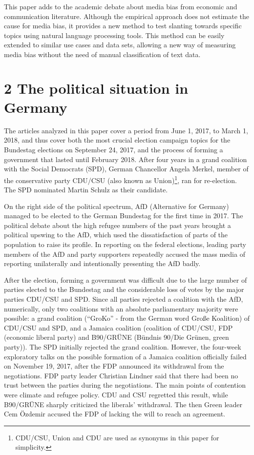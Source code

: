 \documentclass[
  12pt,
]{article}
\begin{document}
This paper adds to the academic debate about media bias from economic
and communication literature. Although the empirical approach does not
estimate the cause for media bias, it provides a new method to test
slanting towards specific topics using natural language processing
tools. This method can be easily extended to similar use cases and data
sets, allowing a new way of measuring media bias without the need of
manual classification of text data.

\pagebreak

\hypertarget{the-political-situation-in-germany}{%
\section{2 The political situation in
Germany}\label{the-political-situation-in-germany}}

The articles analyzed in this paper cover a period from June 1, 2017, to
March 1, 2018, and thus cover both the most crucial election campaign
topics for the Bundestag elections on September 24, 2017, and the
process of forming a government that lasted until February 2018. After
four years in a grand coalition with the Social Democrats (SPD), German
Chancellor Angela Merkel, member of the conservative party CDU/CSU (also
known as Union)\footnote{CDU/CSU, Union and CDU are used as synonyms in
  this paper for simplicity.}, ran for re-election. The SPD nominated
Martin Schulz as their candidate.

On the right side of the political spectrum, AfD (Alternative for
Germany) managed to be elected to the German Bundestag for the first
time in 2017. The political debate about the high refugee numbers of the
past years brought a political upswing to the AfD, which used the
dissatisfaction of parts of the population to raise its profile. In
reporting on the federal elections, leading party members of the AfD and
party supporters repeatedly accused the mass media of reporting
unilaterally and intentionally presenting the AfD badly.

After the election, forming a government was difficult due to the large
number of parties elected to the Bundestag and the considerable loss of
votes by the major parties CDU/CSU and SPD. Since all parties rejected a
coalition with the AfD, numerically, only two coalitions with an
absolute parliamentary majority were possible: a grand coalition
(``GroKo'' - from the German word Große Koalition) of CDU/CSU and SPD,
and a Jamaica coalition (coalition of CDU/CSU, FDP (economic liberal
party) and B90/GRÜNE (Bündnis 90/Die Grünen, green party)). The SPD
initially rejected the grand coalition. However, the four-week
exploratory talks on the possible formation of a Jamaica coalition
officially failed on November 19, 2017, after the FDP announced its
withdrawal from the negotiations. FDP party leader Christian Lindner
said that there had been no trust between the parties during the
negotiations. The main points of contention were climate and refugee
policy. CDU and CSU regretted this result, while B90/GRÜNE sharply
criticized the liberals' withdrawal. The then Green leader Cem Özdemir
accused the FDP of lacking the will to reach an agreement.
\end{document}
